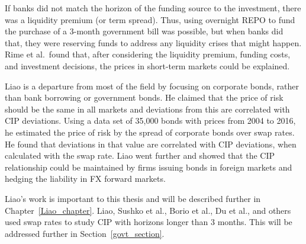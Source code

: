 If banks did not match the horizon of the funding source to the investment, there was a liquidity premium (or term spread).  Thus, using overnight REPO to fund the purchase of a 3-month government bill was possible, but when banks did that, they were reserving funds to address any liquidity crises that might happen.  Rime et al.\ found that, after considering the liquidity premium, funding costs, and investment decisions, the prices in short-term markets could be explained. 

Liao\cite{Liao2016} is a departure from most of the field by focusing on corporate bonds, rather than bank borrowing or government bonds.  He claimed that the price of risk should be the same in all markets and deviations from this are correlated with CIP deviations.  Using a data set of 35,000 bonds with prices from 2004 to 2016, he estimated the price of risk by the spread of corporate bonds over swap rates.  He found that deviations in that value are correlated with CIP deviations, when calculated with the swap rate.  Liao went further and showed that the CIP relationship could be maintained by firms issuing bonds in foreign markets and hedging the liability in FX forward markets.

Liao's work is important to this thesis and will be described further in Chapter~\ref{Liao_chapter}.  Liao, Sushko et al., Borio et al., Du et al., and others used swap rates to study CIP with horizons longer than 3 months.  This will be addressed further in Section~\ref{govt_section}.










